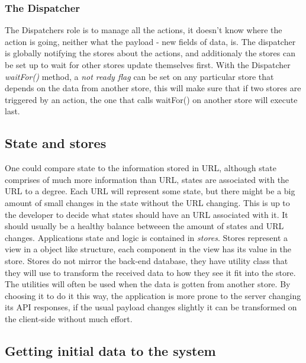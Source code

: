 \subsubsection*{The Dispatcher}
The Dispatchers role is to manage all the actions, it doesn't know where the action is going, neither what the payload - new fields of data, is. The dispatcher is globally notifying the stores about the actions, and additionaly the stores can be set up to wait for other stores update themselves first. With the Dispatcher \emph{waitFor()} method, a \emph{not ready flag} can be set on any particular store that depends on the data from another store, this will make sure that if two stores are triggered by an action, the one that calls waitFor() on another store will execute last. 

\subsection*{State and stores}
One could compare state to the information stored in URL, although state comprises of much more information than URL, states are associated with the URL to a degree. Each URL will represent some state, but there might be a big amount of small changes in the state without the URL changing. This is up to the developer to decide what states should have an URL associated with it. It should usually be a healthy balance betweeen the amount of states and URL changes.
Applications state and logic is contained in \emph{stores}. Stores represent a view in a object like structure, each component in the view has its value in the store. Stores do not mirror the back-end database, they have utility class that they will use to transform the received data to how they see it fit into the store. The utilities will often be used when the data is gotten from another store. By choosing it to do it this way, the application is more prone to the server changing its API responses, if the usual payload changes slightly it can be transformed on the client-side without much effort.

\subsection*{Getting initial data to the system}

